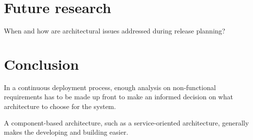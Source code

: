 \documentclass[conference]{IEEEtran}
\begin{document}
\section{Future research}


When and how are architectural issues addressed during release planning? \cite{lindgren2008importance}


\section{Conclusion} %

In a continuous deployment process, enough analysis on non-functional requirements has to be made up front to make an informed decision on what architecture to choose for the system.

A component-based architecture, such as a service-oriented architecture, generally makes the developing and building easier.










{}

\end{document}
